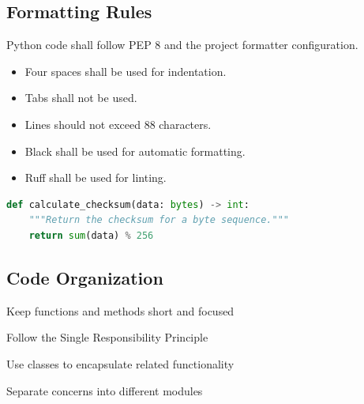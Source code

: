 \subsection{Formatting Rules}

Python code shall follow PEP 8 and the project formatter configuration.

\begin{itemize}
    \item Four spaces shall be used for indentation.
    \item Tabs shall not be used.
    \item Lines should not exceed 88 characters.
    \item Black shall be used for automatic formatting.
    \item Ruff shall be used for linting.
\end{itemize}

\begin{lstlisting}[language=Python]
def calculate_checksum(data: bytes) -> int:
    """Return the checksum for a byte sequence."""
    return sum(data) % 256
\end{lstlisting}

\subsection{Code Organization}

Keep functions and methods short and focused

Follow the Single Responsibility Principle

Use classes to encapsulate related functionality

Separate concerns into different modules

